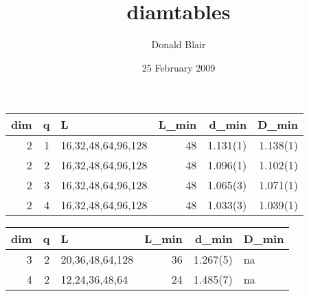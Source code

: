 \documentclass[11pt,a4paper]{article}
\title{diamtables}
\author{Donald Blair}
\date{25 February 2009}
\begin{document}
\maketitle

\setcounter{tocdepth}{3}
\tableofcontents

\begin{tabular}{rrlrrr}
 dim  &  q  &  L                   &  L_{min}  &   d_{min}  &   D_{min}  \\
\hline
   2  &  1  &  16,32,48,64,96,128  &       48  &  1.131(1)  &  1.138(1)  \\
   2  &  2  &  16,32,48,64,96,128  &       48  &  1.096(1)  &  1.102(1)  \\
   2  &  3  &  16,32,48,64,96,128  &       48  &  1.065(3)  &  1.071(1)  \\
   2  &  4  &  16,32,48,64,96,128  &       48  &  1.033(3)  &  1.039(1)  \\
\end{tabular}



\begin{tabular}{rrlrrl}
 dim  &  q  &  L                &  L_{min}  &   d_{min}  &  D_{min}  \\
\hline
   3  &  2  &  20,36,48,64,128  &       36  &  1.267(5)  &  na       \\
   4  &  2  &  12,24,36,48,64   &       24  &  1.485(7)  &  na       \\
\end{tabular}
\end{document}
